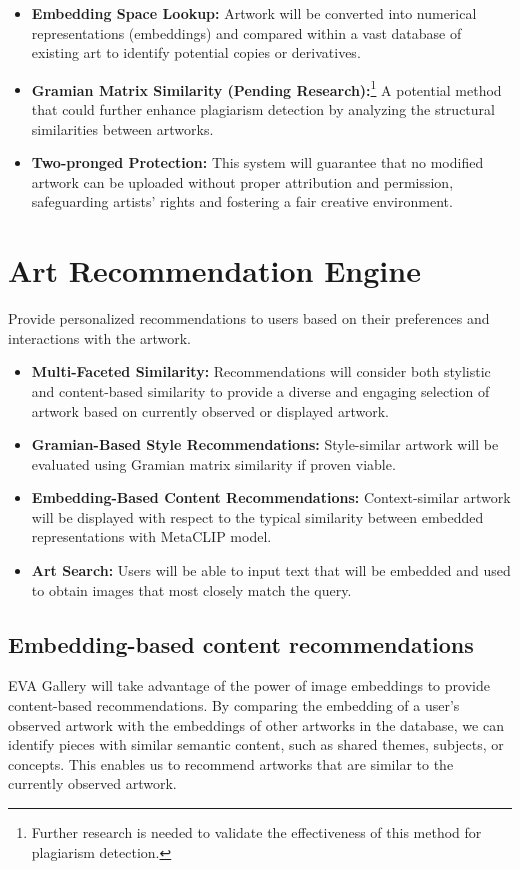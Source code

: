     \begin{itemize}
        \item \textbf{Embedding Space Lookup:} Artwork will be converted into numerical representations (embeddings) and compared within a vast database of existing art to identify potential copies or derivatives.
        \item \textbf{Gramian Matrix Similarity (Pending Research):}\footnote{Further research is needed to validate the effectiveness of this method for plagiarism detection.} A potential method that could further enhance plagiarism detection by analyzing the structural similarities between artworks.
        \item \textbf{Two-pronged Protection:} This system will guarantee that no modified artwork can be uploaded without proper attribution and permission, safeguarding artists' rights and fostering a fair creative environment.
    \end{itemize}

\section{Art Recommendation Engine}
Provide personalized recommendations to users based on their preferences and interactions with the artwork.

\begin{itemize}
    \item \textbf{Multi-Faceted Similarity:} Recommendations will consider both stylistic and content-based similarity to provide a diverse and engaging selection of artwork based on currently observed or displayed artwork.
    \item \textbf{Gramian-Based Style Recommendations:} Style-similar artwork will be evaluated using Gramian matrix similarity if proven viable.
    \item \textbf{Embedding-Based Content Recommendations:} Context-similar artwork will be displayed with respect to the typical similarity between embedded representations with MetaCLIP model.
    \item \textbf{Art Search:} Users will be able to input text that will be embedded and used to obtain images that most closely match the query.
\end{itemize}

\subsection{Embedding-based content recommendations}
EVA Gallery will take advantage of the power of image embeddings to provide content-based recommendations. By comparing the embedding of a user's observed artwork with the embeddings of other artworks in the database, we can identify pieces with similar semantic content, such as shared themes, subjects, or concepts. This enables us to recommend artworks that are similar to the currently observed artwork.

